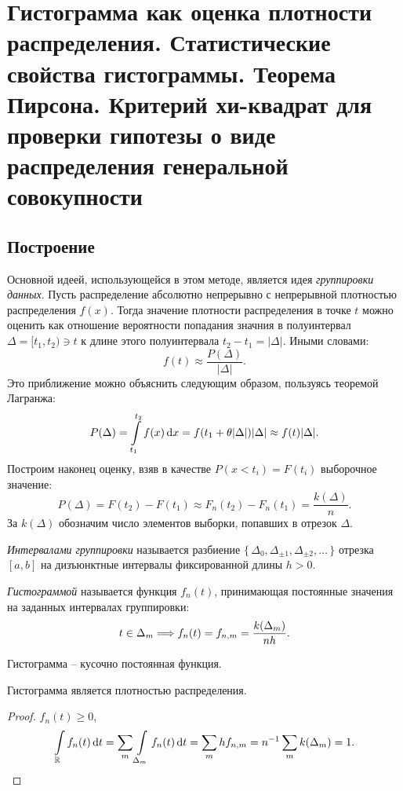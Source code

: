 \section{Гистограмма как оценка плотности распределения. Статистические
    свойства гистограммы. Теорема Пирсона. Критерий хи-квадрат для проверки
гипотезы о виде распределения генеральной совокупности}

\subsection{Построение}
Основной идеей, использующейся в этом методе, является идея \textit{группировки
данных}. Пусть распределение абсолютно непрерывно с непрерывной плотностью
распределения $f(x)$. Тогда значение плотности распределения в точке $t$
можно оценить как отношение вероятности попадания значния в полуинтервал
$\Delta = [t_1, t_2) \ni t$ к длине этого полуинтервала $t_2 - t_1 = |\Delta|$.
Иными словами:
\[
    f(t) \approx \frac{P(\Delta)}{|\Delta|}
.\]
Это приближение можно объяснить следующим образом, пользуясь теоремой Лагранжа:
\[
    P(\Delta) = \int\limits_{t_1}^{t_2}{f(x) \,\mathrm{d} x} = f(t_1 + \theta |\Delta|) |\Delta|
    \approx f(t) |\Delta|
.\]
Построим наконец оценку, взяв в качестве $P(x < t_i) = F(t_i)$
выборочное значение:
\[
    P(\Delta) = F(t_2) - F(t_1) \approx F_n(t_2) - F_n(t_1) = \frac{k(\Delta)}{n}
.\]
За $k(\Delta)$ обозначим число элементов выборки, попавших в отрезок $\Delta$.

\begin{definition}
    \textit{Интервалами группировки} называется разбиение
    $\{\,\Delta_0, \Delta_{\pm 1}, \Delta_{\pm 2}, \ldots\,\}$ отрезка
    $[a, b]$ на дизъюнктные интервалы фиксированной длины $h > 0$.
\end{definition}

\begin{definition}
    \textit{Гистограммой} называется функция $f_n(t)$, принимающая
    постоянные значения на заданных интервалах группировки:
    \[
        t \in \Delta_m \Longrightarrow f_{n}(t) = f_{n, m} = \frac{k(\Delta_m)}{nh}
    .\]
\end{definition}

\begin{remark}
    Гистограмма -- кусочно постоянная функция.
\end{remark}

\begin{theorem}
    Гистограмма является плотностью распределения.
\end{theorem}
\begin{proof}
    $f_n(t) \geqslant 0$,
    \[
        \int\limits_{\mathbb{R}}{f_n(t) \,\mathrm{d} t} = \sum_{m}{\int\limits_{\Delta_m}{f_{n}(t) \,\mathrm{d} t}} =
        \sum_{m}{h f_{n, m}} = n^{-1} \sum_m{k(\Delta_m)} = 1
    .\]
\end{proof}


